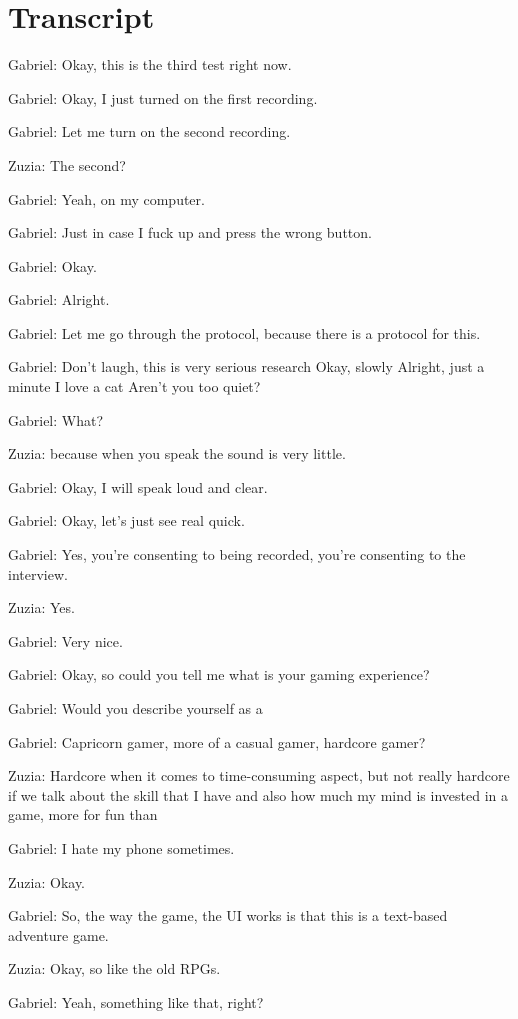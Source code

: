 \section{Transcript}

Gabriel: Okay, this is the third test right now.

Gabriel: Okay, I just turned on the first recording.

Gabriel: Let me turn on the second recording.

Zuzia: The second?

Gabriel: Yeah, on my computer.

Gabriel: Just in case I fuck up and press the wrong button.

Gabriel: Okay.

Gabriel: Alright.

Gabriel: Let me go through the protocol, because there is a protocol for this.

Gabriel: Don't laugh, this is very serious research Okay, slowly Alright, just a minute I love a cat Aren't you too quiet?

Gabriel: What?

Zuzia: because when you speak the sound is very little.

Gabriel: Okay, I will speak loud and clear.

Gabriel: Okay, let's just see real quick.

Gabriel: Yes, you're consenting to being recorded, you're consenting to the interview.

Zuzia: Yes.

Gabriel: Very nice.

Gabriel: Okay, so could you tell me what is your gaming experience?

Gabriel: Would you describe yourself as a

Gabriel: Capricorn gamer, more of a casual gamer, hardcore gamer?

Zuzia: Hardcore when it comes to time-consuming aspect, but not really hardcore if we talk about the skill that I have and also how much my mind is invested in a game, more for fun than

Gabriel: I hate my phone sometimes.

Zuzia: Okay.

Gabriel: So, the way the game, the UI works is that this is a text-based adventure game.

Zuzia: Okay, so like the old RPGs.

Gabriel: Yeah, something like that, right?

